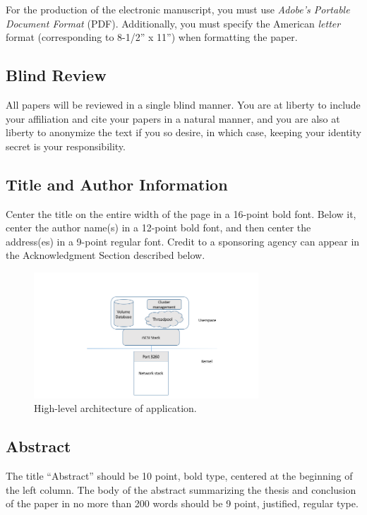 \documentclass[letterpaper]{article}
\begin{document}
For the production of the electronic manuscript, you must use {\em Adobe's Portable Document Format} (PDF). Additionally, you must specify the American {\em letter} format (corresponding to 8-1/2'' x 11'') when formatting the paper.

\subsection{Blind Review}

All papers will be reviewed in a single blind manner.  You are at liberty to include your affiliation and cite your papers in a natural manner, and you are also at liberty to anonymize the text if you so desire, in which case, keeping your identity secret is your responsibility.

\subsection{Title and Author Information}

Center the title on the entire width of the page in a 16-point bold font. Below it, center the author name(s) in a 12-point bold font, and then center the address(es) in a 9-point regular font. Credit to a sponsoring agency can appear in the Acknowledgment Section described below.

\begin{figure}[h]
\includegraphics[width=3.31in]{standard-app-overview.png}
\caption{High-level architecture of application.}
\end{figure}

\subsection{Abstract}

The title ``Abstract'' should be 10 point, bold type, centered at the beginning of the left column. The body of the abstract summarizing the thesis and conclusion of the paper in no more than 200 words should be 9 point, justified, regular type.
\end{document}
